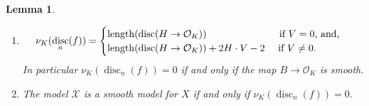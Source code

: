 \documentclass[12pt]{amsart}
\numberwithin{equation}{section}
\newtheorem{lemma}[equation]{Lemma}
\theoremstyle{definition}
\newcommand{\mc}[1]{\mathcal{#1}}
\DeclareMathOperator{\len}{length}
\DeclareMathOperator{\disc}{disc}
\begin{document}
\begin{lemma}\label{Lcollisions}
\hfill
 \begin{enumerate}[\upshape (i)]
 \item $$\nu_K(\disc_n(f)) = \begin{cases} \len (\disc(H \to
 \mc{O}_K)) \textup{ \quad \quad \quad \quad \quad \quad \quad if $V=0$, and,} \\
 \len (\disc(H \to
 \mc{O}_K)) + 2H \cdot V - 2 \textup{ \quad if $V \neq 0$.} \end{cases}$$ 
  In particular $\nu_K(\disc_n(f)) = 0$ if and only if the map $B \rightarrow \mc{O}_K$ is smooth.
 \item\label{Lnormalsmooth}  The model $\mc{X}$ is a
   smooth model for $X$ if and only if $\nu_K({\disc_n(f)}) = 0$. 
\end{enumerate}
\end{lemma}
\end{document}
